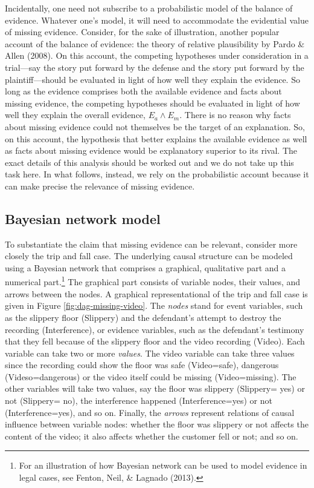 \documentclass[
  10pt,
  dvipsnames,enabledeprecatedfontcommands]{scrartcl}
\begin{document}
Incidentally, one need not subscribe to a probabilistic model of the
balance of evidence. Whatever one's model, it will need to accommodate
the evidential value of missing evidence. Consider, for the sake of
illustration, another popular account of the balance of evidence: the
theory of relative plausibility by Pardo \& Allen (2008). On this
account, the competing hypotheses under consideration in a trial---say
the story put forward by the defense and the story put forward by the
plaintiff---should be evaluated in light of how well they explain the
evidence. So long as the evidence comprises both the available evidence
and facts about missing evidence, the competing hypotheses should be
evaluated in light of how well they explain the overall evidence,
\(E_a\wedge E_m\). There is no reason why facts about missing evidence
could not themselves be the target of an explanation. So, on this
account, the hypothesis that better explains the available evidence as
well as facts about missing evidence would be explanatory superior to
its rival. The exact details of this analysis should be worked out and
we do not take up this task here. In what follows, instead, we rely on
the probabilistic account because it can make precise the relevance of
missing evidence.

\hypertarget{bayesian-network-model}{%
\subsection{Bayesian network model}\label{bayesian-network-model}}

To substantiate the claim that missing evidence can be relevant,
consider more closely the trip and fall case. The underlying causal
structure can be modeled using a Bayesian network that comprises a
graphical, qualitative part and a numerical part.\footnote{For an
  illustration of how Bayesian network can be used to model evidence in
  legal cases, see Fenton, Neil, \& Lagnado (2013).} The graphical part
consists of variable nodes, their values, and arrows between the nodes.
A graphical representational of the trip and fall case is given in
Figure \ref{fig:dag-missing-video}. The \textit{nodes} stand for event
variables, such as the slippery floor (\textsf{Slippery}) and the
defendant's attempt to destroy the recording (\textsf{Interference}), or
evidence variables, such as the defendant's testimony that they fell
because of the slippery floor and the video recording (\textsf{Video}).
Each variable can take two or more \textit{values}. The video variable
can take three values since the recording could show the floor was safe
(\textsf{Video}=\textsf{safe}), dangerous
(\textsf{Videso}=\textsf{dangerous}) or the video itself could be
missing (\textsf{Video}=\textsf{missing}). The other variables will take
two values, say the floor was slippery (\textsf{Slippery}= \textsf{yes})
or not (\textsf{Slippery}= \textsf{no}), the interference happened
(\textsf{Interference}=\textsf{yes}) or not
(\textsf{Interference}=\textsf{yes}), and so on. Finally, the
\textit{arrows} represent relations of causal influence between variable
nodes: whether the floor was slippery or not affects the content of the
video; it also affects whether the customer fell or not; and so on.
\end{document}
